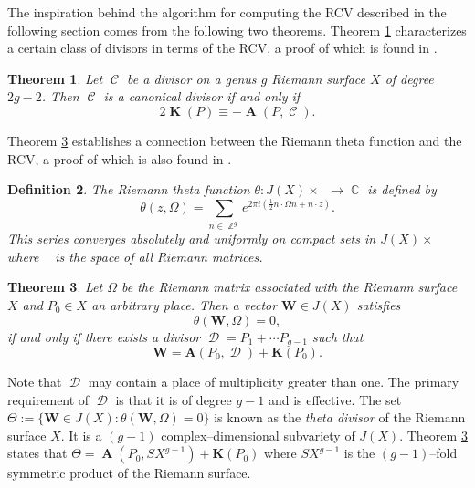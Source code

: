 \documentclass[12pt]{article}
\newtheorem{theorem}{Theorem}
\newtheorem{definition}[theorem]{Definition}
\theoremstyle{definition}
\DeclareMathOperator{\ZZ}{\mathbb{Z}}
\DeclareMathOperator{\CC}{\mathbb{C}}
\DeclareMathOperator{\hg}{\mathfrak{h}_g}
\DeclareMathOperator{\DivC}{\mathcal{C}}
\DeclareMathOperator{\DivD}{\mathcal{D}}
\DeclareMathOperator{\RCV}{\boldsymbol{K}}
\DeclareMathOperator{\Abel}{\boldsymbol{A}}
\begin{document}
The inspiration behind the algorithm for computing the RCV described in
the following section comes from the following two theorems. Theorem
\ref{thm:rcvequiv} characterizes a certain class of divisors in terms of
the RCV, a proof of which is found in \cite{FarkasKra92}.
\begin{theorem} \label{thm:rcvequiv}
  Let $\DivC$ be a divisor on a genus $g$ Riemann surface $X$ of degree
  $2g - 2$. Then $\DivC$ is a canonical divisor if and only if
  \begin{equation} \label{eqn:rcvequiv}
    2\RCV(P) \equiv -\Abel(P,\DivC).
  \end{equation}
\end{theorem}
\noindent Theorem \ref{thm:thetadivisor} establishes a connection
between the Riemann theta function and the RCV, a proof of which is also
found in \cite{FarkasKra92}.
\begin{definition} \label{def:riemanntheta}
  The Riemann theta function $\theta: J(X) \times \hg \to \CC$ is
  defined by
  \begin{equation} \label{eqn:riemanntheta}
    \theta(z,\Omega)
    =
    \sum_{n \in \ZZ^g}
    e^{2 \pi i \left( \tfrac{1}{2} n \cdot \Omega n + n \cdot z \right)}.
  \end{equation}
  This series converges absolutely and uniformly on compact sets in
  $J(X) \times \hg$ where $\hg$ is the space of all Riemann matrices.
\end{definition}

\begin{theorem} \label{thm:thetadivisor}
  Let $\Omega$ be the Riemann matrix associated with the Riemann surface
  $X$ and $P_0 \in X$ an arbitrary place. Then a vector $\boldsymbol{W}
  \in J(X)$ satisfies
  \begin{equation} \label{eqn:thetadivisor1}
    \theta(\boldsymbol{W}, \Omega) = 0,
  \end{equation}
  if and only if there exists a divisor $\DivD = P_1 + \cdots P_{g-1}$
  such that
  \begin{equation} \label{eqn:thetadivisor2}
    \boldsymbol{W} = \boldsymbol{A}(P_0, \DivD) + \boldsymbol{K}(P_0).
  \end{equation}
\end{theorem}
Note that $\DivD$ may contain a place of multiplicity greater than
one. The primary requirement of $\DivD$ is that it is of degree $g-1$
and is effective. The set $\Theta := \{ \boldsymbol{W} \in J(X) :
\theta(\boldsymbol{W},\Omega) = 0\}$ is known as the {\it theta divisor}
of the Riemann surface $X$. It is a $(g-1)$ complex--dimensional
subvariety of $J(X)$. Theorem \ref{thm:thetadivisor} states that $\Theta
= \Abel\left(P_0,SX^{g-1}\right) + \boldsymbol{K}(P_0)$ where $SX^{g-1}$
is the $(g-1)$--fold symmetric product of the Riemann surface.
\end{document}
